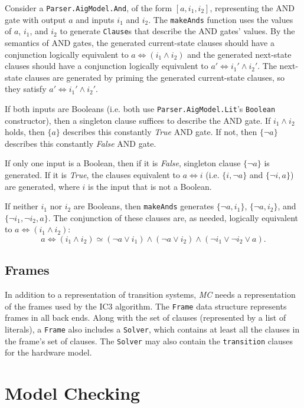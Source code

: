 \documentclass[12pt,a4paper,twoside,openright]{report}
\begin{document}
{{Consider a \verb,Parser.AigModel.And,, of the form $[a, i_1, i_2]$, representing the AND gate
with output $a$ and inputs $i_1$ and $i_2$.
The \verb,makeAnds, function uses the values of $a$, $i_1$, and $i_2$ to generate
\verb,Clause,s that describe the AND gates' values.
By the semantics of AND gates, the generated current-state clauses should have a conjunction
logically equivalent to $a \Leftrightarrow (i_1 \wedge i_2)$ and the generated next-state
clauses should have a conjunction logically equivalent to
$a' \Leftrightarrow i_1' \wedge i_2'$. The next-state clauses are generated
by priming the generated current-state clauses, so they satisfy
$a' \Leftrightarrow i_1' \wedge i_2'$.

If both inputs are Booleans (i.e. both use \verb,Parser.AigModel.Lit,'s \verb,Boolean,
constructor), then a singleton clause suffices to describe the AND gate.
If $i_1 \wedge i_2$ holds, then $\{a\}$ describes this constantly {\it True} AND gate.
If not, then $\{\neg a\}$ describes this constantly {\it False} AND gate.

If only one input is a Boolean, then if it is {\it False},
singleton clause $\{\neg a\}$ is generated. If it is {\it True},
the clauses equivalent to $a \Leftrightarrow i$ (i.e.
$\{i, \neg a\}$ and $\{\neg i, a\}$)
are generated, where $i$ is the input that is not a Boolean.

If neither $i_1$ nor $i_2$ are Booleans, then \verb,makeAnds, generates
$\{\neg a, i_1\}$, $\{\neg a, i_2\}$, and
$\{\neg i_1,\neg i_2, a\}$. The conjunction of these clauses are, as needed,
logically equivalent to $a \Leftrightarrow (i_1 \wedge i_2)$:
$$a \Leftrightarrow (i_1 \wedge i_2) \simeq
(\neg a \vee i_1) \wedge (\neg a \vee i_2) \wedge (\neg i_1 \vee \neg i_2 \vee a).$$

\subsection{Frames}
In addition to a representation of transition systems, \emph{MC} needs a representation
of the frames used by the IC3 algorithm.
The \verb,Frame, data structure represents frames in all back ends.
Along with the set of clauses (represented by a list of literals), a \verb,Frame, also
includes a \verb,Solver,, which contains at least all the clauses in the frame's set
of clauses.
The \verb,Solver, may also contain the \verb,transition, clauses for the hardware model.

\section{Model Checking}
\label{impl:modelchecker}

}}
\end{document}
